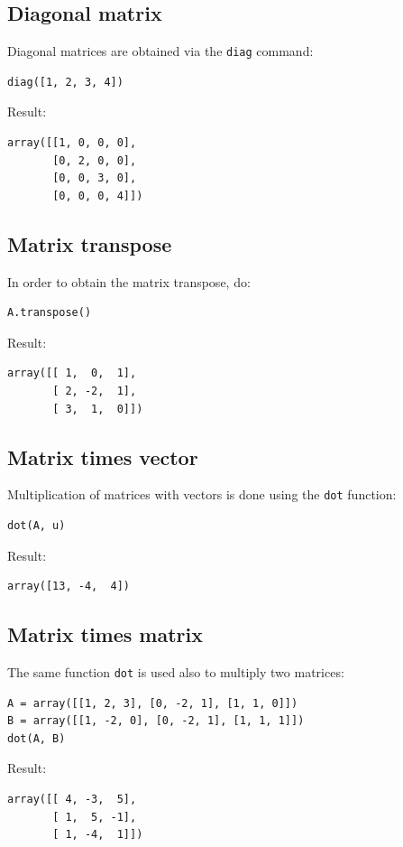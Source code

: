 \documentclass[article,A4,12pt]{llncs}
\begin{document}
\subsection{Diagonal matrix}

Diagonal matrices are obtained via the {\tt diag} command:
\begin{verbatim}
diag([1, 2, 3, 4])
\end{verbatim}
Result:
\begin{verbatim}
array([[1, 0, 0, 0],
       [0, 2, 0, 0],
       [0, 0, 3, 0],
       [0, 0, 0, 4]])
\end{verbatim}

\subsection{Matrix transpose}

In order to obtain the matrix transpose, do:
\begin{verbatim}
A.transpose()
\end{verbatim}
Result:
\begin{verbatim}
array([[ 1,  0,  1],
       [ 2, -2,  1],
       [ 3,  1,  0]])
\end{verbatim}

\subsection{Matrix times vector}

Multiplication of matrices with vectors is done using the {\tt dot} function:
\begin{verbatim}
dot(A, u)
\end{verbatim}
Result:
\begin{verbatim}
array([13, -4,  4])
\end{verbatim}

\subsection{Matrix times matrix}

The same function {\tt dot} is used also to multiply two matrices:
\begin{verbatim}
A = array([[1, 2, 3], [0, -2, 1], [1, 1, 0]])
B = array([[1, -2, 0], [0, -2, 1], [1, 1, 1]])
dot(A, B)
\end{verbatim}
Result:
\begin{verbatim}
array([[ 4, -3,  5],
       [ 1,  5, -1],
       [ 1, -4,  1]])
\end{verbatim}
\end{document}
